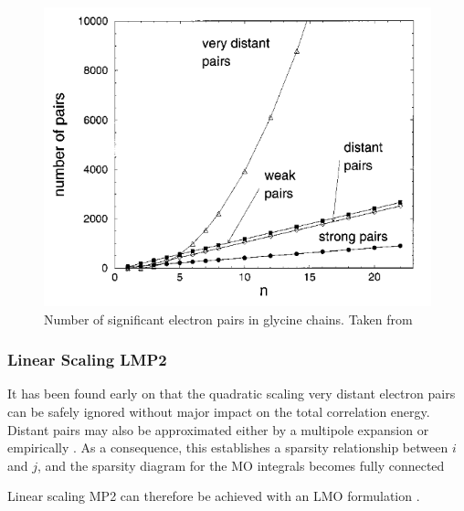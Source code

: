 \begin{figure}
\centering
\includegraphics[scale=0.5]{Pics/electron_pairs.png}
\caption[Number of significant electron pairs in glycine chains.]{Number of significant electron pairs in glycine chains. Taken from \cite{Sch1999}}
\label{fig:EPAIRS}
\end{figure}

\subsubsection{Linear Scaling LMP2}

It has been found \cite{Sae1987} early on that the quadratic scaling very distant electron pairs can be safely ignored without major impact on the total correlation energy. Distant pairs may also be approximated either by a multipole expansion \cite{Het1998} or empirically \cite{Rau1995}. As a consequence, this establishes a sparsity relationship between $i$ and $j$, and the sparsity diagram for the MO integrals becomes fully connected
\begin{center}
\end{center}
\noindent Linear scaling MP2 can therefore be achieved with an LMO formulation \cite{Sch1999}.

